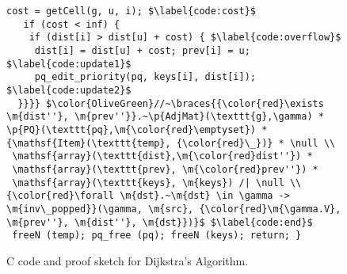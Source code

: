 \begin{figure}[t]
\begin{lstlisting}[mathescape=true,showlines=true]
   cost = getCell(g, u, i); $\label{code:cost}$
   if (cost < inf) {
    if (dist[i] > dist[u] + cost) { $\label{code:overflow}$
     dist[i] = dist[u] + cost; prev[i] = u; $\label{code:update1}$
     pq_edit_priority(pq, keys[i], dist[i]); $\label{code:update2}$
  }}}} $\color{OliveGreen}//~\braces{{\color{red}\exists \m{dist''}, \m{prev''}}.~\p{AdjMat}(\texttt{g},\gamma) * \p{PQ}(\texttt{pq},\m{\color{red}\emptyset}) * {\mathsf{Item}(\texttt{temp}, {\color{red}\_})} * \null \\
 \mathsf{array}(\texttt{dist},\m{\color{red}dist''}) *
 \mathsf{array}(\texttt{prev}, \m{\color{red}prev''}) *
 \mathsf{array}(\texttt{keys}, \m{keys}) /| \null \\
{\color{red}\forall \m{dst}.~\m{dst} \in \gamma -> \m{inv\_popped}}(\gamma, \m{src}, {\color{red}\m{\gamma.V}, \m{prev''}, \m{dist''}, \m{dst}})}$ $\label{code:end}$
 freeN (temp); pq_free (pq); freeN (keys); return; }
\end{lstlisting}
\vspace{-1em}
\caption{C code and proof sketch for Dijkstra's Algorithm.}
\vspace{-1em}
\label{fig:decorated}
\end{figure}



